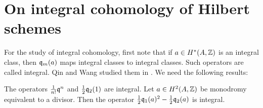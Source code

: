 \section{On integral cohomology of Hilbert schemes}

For the study of integral cohomology, first note that if $a \in H^*(A,\mathbb{Z})$ is an integral class, then $\mathfrak{q}_{m}(a) $ maps integral classes to integral classes. Such operators are called integral. Qin and Wang studied them in \cite{QinWang}. We need the following results:

\begin{lemma} \cite{QinWang}\label{IntegralOperators}
The operators $\frac{1}{n!}\mathfrak{q}^n$ and $\frac{1}{2}\mathfrak{q}_2(1) $ are integral.
Let $a\in H^2(A,\mathbb{Z})$ be monodromy equivalent to a divisor. Then the operator $\frac{1}{2}\mathfrak{q}_1(a)^2 - \frac{1}{2}\mathfrak{q}_2(a)$ is integral. 
\end{lemma}


